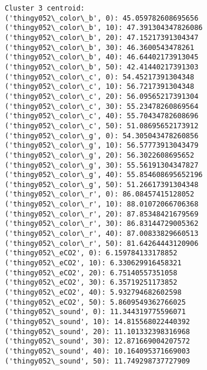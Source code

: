 \documentclass[11pt]{article}
\begin{document}
\begin{Verbatim}[commandchars=\\\{\}]
Cluster 3 centroid:
('thingy052\_color\_b', 0): 45.059782608695656
('thingy052\_color\_b', 10): 47.391304347826086
('thingy052\_color\_b', 20): 47.15217391304347
('thingy052\_color\_b', 30): 46.3600543478261
('thingy052\_color\_b', 40): 46.64402173913045
('thingy052\_color\_b', 50): 42.41440217391303
('thingy052\_color\_c', 0): 54.45217391304348
('thingy052\_color\_c', 10): 56.7217391304348
('thingy052\_color\_c', 20): 56.09565217391304
('thingy052\_color\_c', 30): 55.23478260869564
('thingy052\_color\_c', 40): 55.70434782608696
('thingy052\_color\_c', 50): 51.08695652173912
('thingy052\_color\_g', 0): 54.305043478260856
('thingy052\_color\_g', 10): 56.57773913043479
('thingy052\_color\_g', 20): 56.3022608695652
('thingy052\_color\_g', 30): 55.56191304347827
('thingy052\_color\_g', 40): 55.854608695652196
('thingy052\_color\_g', 50): 51.26617391304348
('thingy052\_color\_r', 0): 86.08457415128052
('thingy052\_color\_r', 10): 88.01072066706368
('thingy052\_color\_r', 20): 87.85348421679569
('thingy052\_color\_r', 30): 86.83144729005362
('thingy052\_color\_r', 40): 87.00833829660513
('thingy052\_color\_r', 50): 81.64264443120906
('thingy052\_eCO2', 0): 6.159784133178852
('thingy052\_eCO2', 10): 6.330629916458321
('thingy052\_eCO2', 20): 6.75140557351058
('thingy052\_eCO2', 30): 6.35719251173852
('thingy052\_eCO2', 40): 5.932794682602598
('thingy052\_eCO2', 50): 5.8609549362766025
('thingy052\_sound', 0): 11.344319775596071
('thingy052\_sound', 10): 14.815568022440392
('thingy052\_sound', 20): 11.101332398316968
('thingy052\_sound', 30): 12.871669004207572
('thingy052\_sound', 40): 10.164095371669003
('thingy052\_sound', 50): 11.749298737727909


\end{Verbatim}
\end{document}
